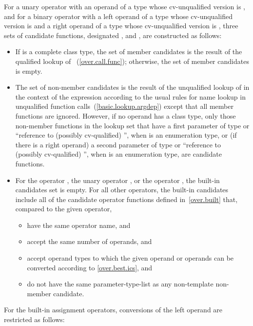\pnum
For a unary operator
with an operand of a type whose cv-unqualified version is
,
and for a binary operator
with a left operand of a type whose cv-unqualified version is
and a right operand of a type whose cv-unqualified version is
,
three sets of candidate functions, designated
,
and
,
are constructed as follows:
\begin{itemize}
\item
If
is a complete class type, the set of member candidates is the
result of the qualified lookup of
~(\ref{over.call.func}); otherwise, the set of member
candidates is empty.
\item
The set of non-member candidates is the result of the unqualified lookup of
in the context of
the expression according to the usual rules for name
lookup in unqualified function calls~(\ref{basic.lookup.argdep}) except
that all member functions are ignored.
However, if no operand has a class type, only those non-member
functions in the lookup set that have a first parameter of type
or ``reference to (possibly cv-qualified)
'',
when
is an enumeration type,
or (if there is a right operand) a second parameter of type
or ``reference to (possibly cv-qualified)
'',
when
is an enumeration type,
are candidate functions.
\item
For the operator
\tcode{,},
the unary operator
\tcode{\&},
or the operator
\tcode{->},
the built-in candidates set is empty.
For all other operators, the built-in candidates include all
of the candidate operator functions defined in~\ref{over.built} that,
compared to the given operator,

\begin{itemize}
\item
have the same operator name, and
\item
accept the same number of operands, and
\item
accept operand types to which the given operand or
operands can be converted according to \ref{over.best.ics}, and
\item
do not have the same parameter-type-list as any non-template
non-member candidate.
\end{itemize}
\end{itemize}

\pnum
For the built-in assignment operators, conversions of the left
operand are restricted as follows:

